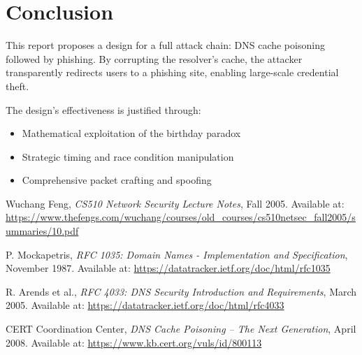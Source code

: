 \documentclass[12pt,a4paper]{article}
\begin{document}
\section{Conclusion}

This report proposes a design for a full attack chain: DNS cache poisoning followed by phishing. By corrupting the resolver's cache, the attacker transparently redirects users to a phishing site, enabling large-scale credential theft. 

The design's effectiveness is justified through:
\begin{itemize}
    \item Mathematical exploitation of the birthday paradox
    \item Strategic timing and race condition manipulation
    \item Comprehensive packet crafting and spoofing
\end{itemize}


\begin{thebibliography}{9}

Wuchang Feng, \textit{CS510 Network Security Lecture Notes}, Fall 2005.  
Available at: \url{https://www.thefengs.com/wuchang/courses/old_courses/cs510netsec_fall2005/summaries/10.pdf}

P. Mockapetris, \textit{RFC 1035: Domain Names - Implementation and Specification}, November 1987.  
Available at: \url{https://datatracker.ietf.org/doc/html/rfc1035}

R. Arends et al., \textit{RFC 4033: DNS Security Introduction and Requirements}, March 2005.  
Available at: \url{https://datatracker.ietf.org/doc/html/rfc4033}

CERT Coordination Center, \textit{DNS Cache Poisoning – The Next Generation}, April 2008.  
Available at: \url{https://www.kb.cert.org/vuls/id/800113}

\end{thebibliography}
\end{document}
